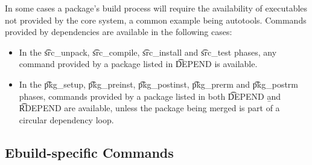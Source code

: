 In some cases a package's build process will require the availability of executables not provided by
the core system, a common example being autotools. Commands provided by dependencies are available
in the following cases:
\begin{itemize}
\item In the \t{src\_unpack}, \t{src\_compile}, \t{src\_install} and \t{src\_test} phases, any
    command provided by a package listed in \t{DEPEND} is available.
\item In the \t{pkg\_setup}, \t{pkg\_preinst}, \t{pkg\_postinst}, \t{pkg\_prerm} and \t{pkg\_postrm}
    phases, commands provided by a package listed in both \t{DEPEND} \b{and} \t{RDEPEND} are
    available, unless the package being merged is part of a circular dependency loop.
\end{itemize}

\subsection{Ebuild-specific Commands}


